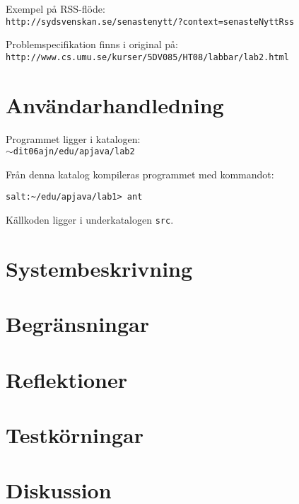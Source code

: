 \documentclass[a4paper, 12pt]{article}
\def\pathtocode{$\sim$dit06ajn/edu/apjava/lab2}
\begin{document}
Exempel på RSS-flöde:\\
\verb!http://sydsvenskan.se/senastenytt/?context=senasteNyttRss!

Problemspecifikation finns i original på:\\
\verb!http://www.cs.umu.se/kurser/5DV085/HT08/labbar/lab2.html!

\section{Användarhandledning}
Programmet ligger i katalogen:\\
\texttt{\pathtocode}

Från denna katalog kompileras programmet med kommandot:

\verb!salt:~/edu/apjava/lab1> ant!

Källkoden ligger i underkatalogen \verb!src!.


\section{Systembeskrivning}

\section{Begränsningar}

\section{Reflektioner}

\section{Testkörningar}

\section{Diskussion}
\end{document}
